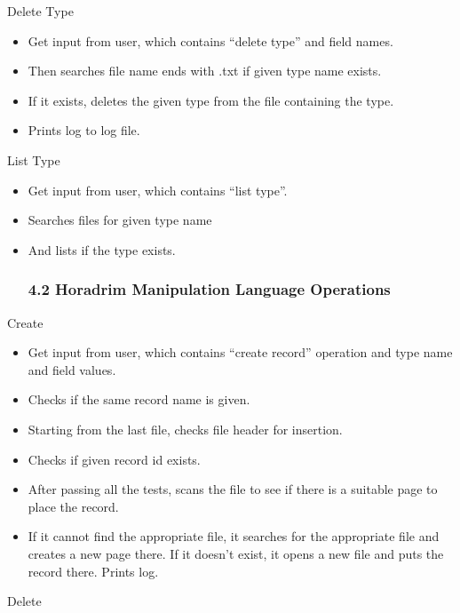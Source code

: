 \documentclass[
]{article}
\begin{document}
Delete Type

\begin{itemize}
\item
  Get input from user, which contains ``delete type'' and field names.
\item
  Then searches file name ends with .txt if given type name exists.
\item
  If it exists, deletes the given type from the file containing the
  type.
\item
  Prints log to log file.
\end{itemize}

List Type

\begin{itemize}
\item
  Get input from user, which contains ``list type''.
\item
  Searches files for given type name
\item
  And lists if the type exists.

    \hypertarget{horadrim-manipulation-language-operations}{%
    \subsubsection{4.2 Horadrim Manipulation Language
    Operations}\label{horadrim-manipulation-language-operations}}
\end{itemize}

Create

\begin{itemize}
\item
  Get input from user, which contains ``create record'' operation and
  type name and field values.
\item
    Checks if the same record name is given.
\item
    Starting from the last file, checks file header for insertion.
\item
    Checks if given record id exists.
\item
    After passing all the tests, scans the file to see if there is a suitable page to place the record.
\item
    If it cannot find the appropriate file, it searches for the appropriate file and creates a new page there. If it doesn't exist, it opens a new file and puts the record there. Prints log.

\end{itemize}

Delete
\end{document}
